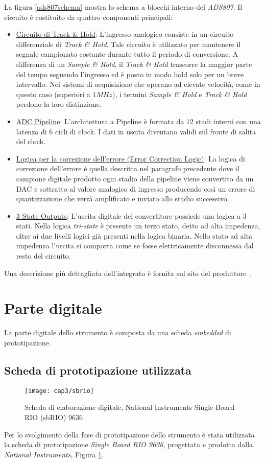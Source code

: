 La figura \ref{ads807schema} mostra lo schema a blocchi interno del \textit{ADS807}.
Il circuito è costituito da quattro componenti principali:
\begin{itemize}
	\item \underline{Circuito di Track \& Hold}: L'ingresso analogico consiste in un circuito differenziale di \textit{Track \& Hold}. Tale circuito è utilizzato per mantenere il segnale campionato costante durante tutto il periodo di conversione. A differenza di un \textit{Sample \& Hold}, il \textit{Track \& Hold} trascorre la maggior parte del tempo seguendo l'ingresso ed è posto in modo hold solo per un breve intervallo. Nei sistemi di acquisizione che operano ad elevate velocità, come in questo caso (superiori a $1MHz$), i termini \textit{Sample \& Hold} e \textit{Track \& Hold} perdono la loro distinzione.
	\item \underline{ADC Pipeline}: L'architettura a Pipeline è formata da $12$ stadi interni con una latenza di $6$ cicli di clock. I dati in uscita diventano validi sul fronte di salita del clock.
	\item \underline{Logica per la correzione dell'errore (Error Correction Logic)}: La logica di correzione dell'errore è quella descritta nel paragrafo precedente dove il campione digitale prodotto ogni stadio della pipeline viene convertito da un DAC e sottratto al valore analogico di ingresso producendo così un errore di quantizzazione che verrà amplificato e inviato allo stadio successivo.
	\item \underline{3 State Outputs}: L'uscita digitale del convertitore possiede una logica a $3$ stati. Nella logica \textit{tri-state} è presente un terzo stato, detto ad alta impedenza, oltre ai due livelli logici già presenti nella logica binaria. Nello stato ad alta impedenza l'uscita si comporta come se fosse elettricamente disconnessa dal resto del circuito.
\end{itemize}
Una descrizione più dettagliata dell'integrato è fornita sul sito del produttore~\cite{siteads807}.

\section{Parte digitale}
La parte digitale dello strumento è composta da una scheda \textit{embedded} di prototipazione. 

\subsection{Scheda di prototipazione utilizzata}
\begin{figure}  
  \begin{center}
    \texttt{[image: cap3/sbrio]}
    \caption{Scheda di elaborazione digitale, National Instruments Single-Board RIO (sbRIO) 9636}
    \label{sbrio}
  \end{center}
\end{figure}
Per lo svolgimento della fase di prototipazione dello strumento è stata utilizzata la scheda di prototipazione \textit{Single Board RIO 9636}, progettata e prodotta dalla \textit{National Instruments}, Figura \ref{sbrio}.

